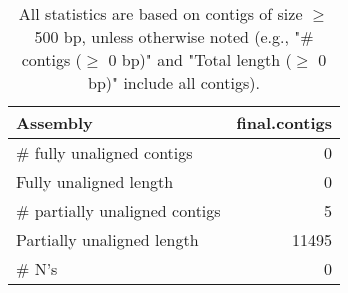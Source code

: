 \documentclass[12pt,a4paper]{article}
\begin{document}
\begin{table}[ht]
\begin{center}
\caption{All statistics are based on contigs of size $\geq$ 500 bp, unless otherwise noted (e.g., "\# contigs ($\geq$ 0 bp)" and "Total length ($\geq$ 0 bp)" include all contigs).}
\begin{tabular}{|l*{1}{|r}|}
\hline
Assembly & final.contigs \\ \hline
\# fully unaligned contigs & 0 \\ \hline
Fully unaligned length & 0 \\ \hline
\# partially unaligned contigs & 5 \\ \hline
Partially unaligned length & 11495 \\ \hline
\# N's & 0 \\ \hline
\end{tabular}
\end{center}
\end{table}
\end{document}
